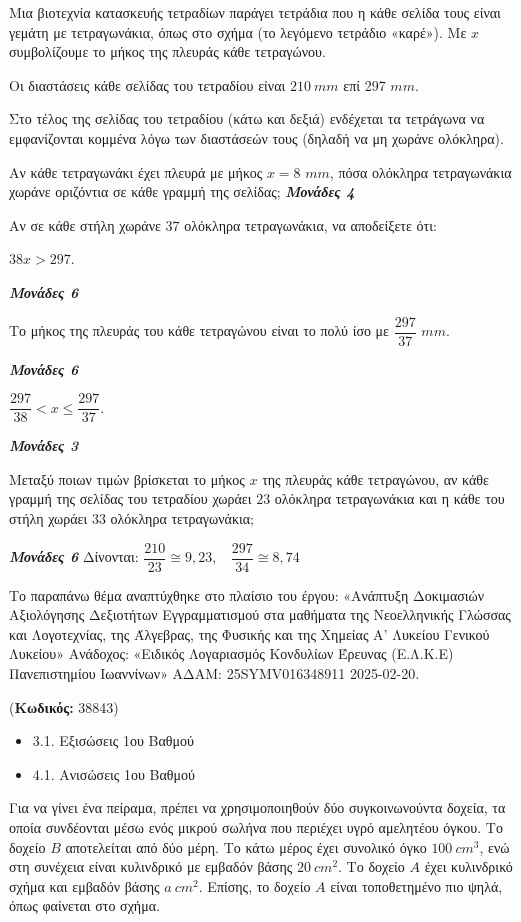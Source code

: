 \documentclass[11pt,a4paper,twoside]{book}
\newcounter{askhsh}[chapter]
\renewcommand{\theaskhsh}{
	\bf{\titlefont{\Large{\thechapter}}.\arabic{askhsh}}
}
\newcommand{\Askhsh}[2]{\refstepcounter{askhsh}{\titlefont{Άσκηση\theaskhsh} - \textcolor{maincolor}{ΘΕΜΑ #2}} ({\small{\textbf{Κωδικός:} #1}})\\}{}
\newenvironment{ylh}{
\begin{tcolorbox}[
breakable,
enhanced standard,
titlerule=0pt,
toprule=0pt, 
rightrule=0pt, 
bottomrule=0pt,
title={\titlefont Ύλη άσκησης},
colback=white,
opacityback=0,
left=2mm,
top=1mm,
bottom=0mm,
boxrule=0pt,
colframe=white,
borderline west={1.5mm}{0pt}{secondarycolor},
leftrule=2mm,
sharp corners,
coltitle=black
]
\begin{itemize}[leftmargin=3mm, itemsep=0mm, label=\textcolor{secondarycolor}{{\small\faBook}}]
}{
\end{itemize}
\end{tcolorbox}
}
\newcommand{\monades}[1]{
\hspace*{\fill}
\textbf{\textit{\textcolor{maincolor}{Μονάδες #1}}}}
\begin{document}
Μια βιοτεχνία κατασκευής τετραδίων παράγει τετράδια που η κάθε σελίδα τους είναι γεμάτη με τετραγωνάκια, όπως στο σχήμα (το λεγόμενο τετράδιο «καρέ»). Με $x$ συμβολίζουμε το μήκος της πλευράς κάθε τετραγώνου.

Οι διαστάσεις κάθε σελίδας του τετραδίου είναι $210\ mm$ επί 297 $mm$.

Στο τέλος της σελίδας του τετραδίου (κάτω και δεξιά) ενδέχεται τα τετράγωνα να εμφανίζονται κομμένα λόγω των διαστάσεών τους (δηλαδή να μη χωράνε ολόκληρα).

\begin{alist}
\item Αν κάθε τετραγωνάκι έχει πλευρά με μήκος $x = 8$ $mm$, πόσα ολόκληρα τετραγωνάκια χωράνε οριζόντια σε κάθε γραμμή της σελίδας;\monades{4}
\item Αν σε κάθε στήλη χωράνε $37$ ολόκληρα τετραγωνάκια, να αποδείξετε ότι:

\begin{rlist}
\item $38x > 297$.
\monades{6}
\item Το μήκος της πλευράς του κάθε τετραγώνου είναι το πολύ ίσο με $\dfrac{297}{37}$ $mm$.
\monades{6}
\item $\dfrac{297}{38} < x \leq \dfrac{297}{37}.$
\monades{3}
\end{rlist}
\item Μεταξύ ποιων τιμών βρίσκεται το μήκος $x$ της πλευράς κάθε τετραγώνου, αν κάθε γραμμή της σελίδας του τετραδίου χωράει $23$ ολόκληρα τετραγωνάκια και η κάθε του στήλη χωράει $33$ ολόκληρα τετραγωνάκια;
\monades{6}
Δίνονται: $\dfrac{210}{23} \cong 9,23,\ \ \ \ \dfrac{297}{34} \cong 8,74$
\end{alist}
{\footnotesize Το παραπάνω θέμα αναπτύχθηκε στο πλαίσιο του έργου: «Ανάπτυξη Δοκιμασιών Αξιολόγησης Δεξιοτήτων Εγγραμματισμού στα μαθήματα της Νεοελληνικής Γλώσσας και Λογοτεχνίας, της Άλγεβρας, της Φυσικής και της Χημείας Α' Λυκείου Γενικού Λυκείου» Ανάδοχος: «Ειδικός Λογαριασμός Κονδυλίων Έρευνας (Ε.Λ.Κ.Ε) Πανεπιστημίου Ιωαννίνων» ΑΔΑΜ: 25SYMV016348911 2025-02-20.
}

\vspace{4mm}
\Askhsh{38843}{4}
\begin{ylh}
    \item 3.1. Εξισώσεις 1ου Βαθμού
    \item 4.1. Ανισώσεις 1ου Βαθμού
\end{ylh}

Για να γίνει ένα πείραμα, πρέπει να χρησιμοποιηθούν δύο συγκοινωνούντα δοχεία, τα οποία συνδέονται μέσω ενός μικρού σωλήνα που περιέχει υγρό αμελητέου όγκου. Το δοχείο $B$ αποτελείται από δύο μέρη. Το κάτω μέρος έχει συνολικό όγκο $100\ cm^{3}$, ενώ στη συνέχεια είναι κυλινδρικό με εμβαδόν βάσης $20\ cm^{2}$. Το δοχείο $A$ έχει κυλινδρικό σχήμα και εμβαδόν βάσης $a\ cm^{2}$. Επίσης, το δοχείο $A$ είναι τοποθετημένο πιο ψηλά, όπως φαίνεται στο σχήμα.
\end{document}
